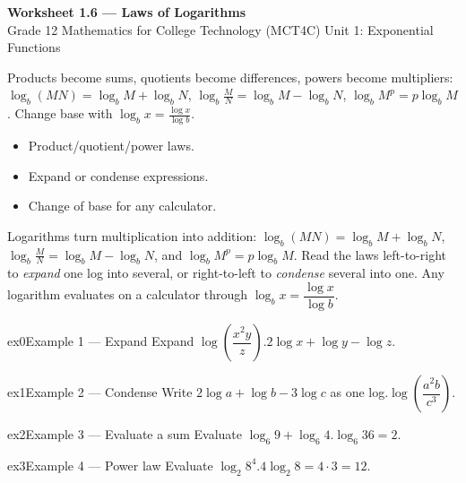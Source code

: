\documentclass[11pt]{article}
\begin{document}
\begin{center}
{\LARGE\bfseries\color{titleblue}Worksheet 1.6 --- Laws of Logarithms}\\[2pt]
{\small Grade 12 Mathematics for College Technology (MCT4C) \textperiodcentered{} Unit 1: Exponential Functions}
\end{center}

\begin{ideabox}
Products become sums, quotients become differences, powers become multipliers: $\log_b(MN)=\log_b M+\log_b N$, $\log_b\tfrac{M}{N}=\log_b M-\log_b N$, $\log_b M^p=p\log_b M$. Change base with $\log_b x=\tfrac{\log x}{\log b}$.
\begin{itemize}[leftmargin=*,itemsep=2pt]
  \item Product/quotient/power laws.
  \item Expand or condense expressions.
  \item Change of base for any calculator.
\end{itemize}
\end{ideabox}

\begin{learnbox}
Logarithms turn multiplication into addition: $\log_b(MN)=\log_b M+\log_b N$, $\log_b\tfrac{M}{N}=\log_b M-\log_b N$, and $\log_b M^p=p\log_b M$.
Read the laws left-to-right to \emph{expand} one log into several, or right-to-left to \emph{condense} several into one.
Any logarithm evaluates on a calculator through $\log_b x=\dfrac{\log x}{\log b}$.
\end{learnbox}


\begin{example}{ex0}{Example 1 --- Expand}
Expand $\log\!\left(\dfrac{x^2y}{z}\right)$.\soln $2\log x+\log y-\log z$.
\end{example}

\begin{example}{ex1}{Example 2 --- Condense}
Write $2\log a+\log b-3\log c$ as one log.\soln $\log\!\left(\dfrac{a^2b}{c^3}\right)$.
\end{example}

\begin{example}{ex2}{Example 3 --- Evaluate a sum}
Evaluate $\log_6 9+\log_6 4$.\soln $\log_6 36=2$.
\end{example}

\begin{example}{ex3}{Example 4 --- Power law}
Evaluate $\log_2 8^4$.\soln $4\log_2 8=4\cdot3=12$.
\end{example}
\end{document}
